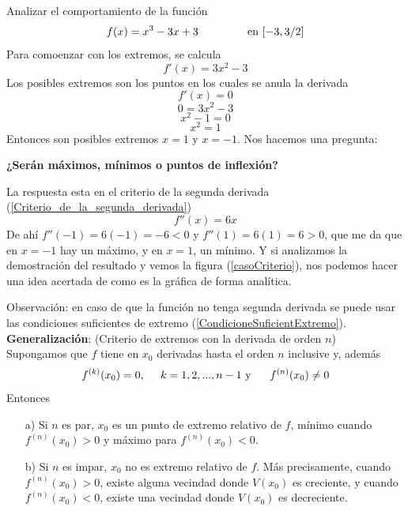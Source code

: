 \documentclass[10pt,twoside]{SelfArx} %
\begin{document}
   \begin{ejemplo}
   	Analizar el comportamiento de la función
   	\begin{equation}
   	f(x)=x^{3}-3x+3 \;\;\;\;\;\;\;\;\;\;\;\;\;\;\;\;\mbox{en $ [-3,3/2] $}
   	\end{equation}
   	Para comoenzar con  los extremos, se calcula
   	\begin{equation}
   	f'(x)=3x^{2}-3
   	\end{equation}
   	Los posibles extremos son los puntos en los cuales se anula la derivada
   	\begin{equation}
   	f'(x)=0
   	\end{equation}
   	\begin{equation}
	0=3x^{2}-3
   	\end{equation}
   	\begin{equation}
   	x^{2}-1=0
   	\end{equation}
   	\begin{equation}
   	x^{2}=1
   	\end{equation}
   	Entonces son posibles extremos $ x=1 $ y $ x=-1 $.
   	Nos hacemos una pregunta:
   	\begin{center}
   		\textbf{¿Serán máximos, mínimos o puntos de inflexión?}
   	\end{center}
   	La respuesta esta en el criterio de la segunda derivada (\ref{Criterio_de_la_segunda_derivada})
   	\begin{equation}
   	f''(x)=6x
   	\end{equation}
   	De ahí $ 	f''(-1)=6(-1)=-6<0 $ y $ f''(1)=6(1)=6>0 $, que me da que en $ x=-1 $ hay un máximo, y en $ x=1 $, un mínimo. Y si analizamos la demostración del resultado y vemos la figura (\ref{casoCriterio}), nos podemos hacer una idea acertada de como es la gráfica de forma analítica.
   \end{ejemplo}
    Observación: en caso de que la función no tenga segunda derivada se puede usar las condiciones suficientes de extremo (\ref{CondicioneSuficientExtremo}).
    \textbf{Generalización}: (Criterio de extremos con la derivada de orden $ n $)\\
    Supongamos que $ f $ tiene en $ x_{0} $ derivadas hasta el orden $ n $ inclusive y, adem\'as
    \[ f^{(k)}(x_{0})=0,\;\;\;\;\; \mbox{$ k=1,2,...,n-1 $ y }\;\;\;\;\; f^{(n)}(x_{0})\neq0 \]
    Entonces
    \begin{enumerate}
    	\item [a)]	Si $ n $ es par, $ x_{0} $ es un punto de extremo relativo  de $ f $, mínimo cuando $ f^{(n)}(x_{0})>0 $ y máximo para $ f^{(n)}(x_{0})<0 $.
    	
    	\item [b)]	Si $ n $ es impar, $ x_{0} $ no es  extremo relativo  de $ f $. Más precisamente, cuando $ f^{(n)}(x_{0})>0 $, existe alguna vecindad donde $ V(x_{0}) $ es creciente, y cuando $ f^{(n)}(x_{0})<0 $, existe una vecindad donde $ V(x_{0}) $ es decreciente.
    \end{enumerate}
    
\end{document}
